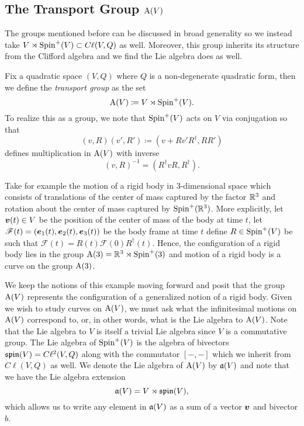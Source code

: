 \documentclass{article}
\begin{document}
\subsection{The Transport Group $\operatorname{A}(V)$}

The groups mentioned before can be discussed in broad generality so we instead take $V\rtimes \operatorname{Spin}^+(V) \subset C\ell(V,Q)$ as well. Moreover, this group inherits its structure from the Clifford algebra and we find the Lie algebra does as well. 

\begin{definition}
Fix a quadratic space $(V,Q)$ where $Q$ is a non-degenerate quadratic form, then we define the \emph{transport group} as the set
\begin{equation}
\operatorname{A}(V)\coloneqq V\rtimes \operatorname{Spin}^+(V).
\end{equation}
To realize this as a group, we note that $\operatorname{Spin}^+(V)$ acts on $V$ via conjugation so that
\begin{equation}
\label{eq:product_in_A}
(v,R)(v',R')\coloneqq(v+Rv'R^\dagger, RR')
\end{equation}
defines multiplication in $\operatorname{A}(V)$ with inverse
\begin{equation}
(v,R)^{-1} = (R^\dagger v R, R^\dagger).
\end{equation}
\end{definition}

\begin{example}
Take for example the motion of a rigid body in 3-dimensional space which consists of translations of the center of mass captured by the factor $\mathbb{R}^3$ and rotation about the center of mass captured by $\operatorname{Spin}^+(\mathbb{R}^3)$. More explicitly, let $\boldsymbol{v}(t) \in V$ be the position of the center of mass of the body at time $t$, let $\mathscr{F}(t)=(\boldsymbol{e}_1(t),\boldsymbol{e}_2(t),\boldsymbol{e}_3(t))$ be the body frame at time $t$ define $R \in \operatorname{Spin}^+(V)$ be such that $\mathscr{F}(t)=R(t)\mathscr{F}(0)R^\dagger(t)$. Hence, the configuration of a rigid body lies in the group $\operatorname{A}(3)=\mathbb{R}^3 \rtimes \operatorname{Spin}^+(3)$ and motion of a rigid body is a curve on the group $\operatorname{A}(3)$.
\end{example}

We keep the notions of this example moving forward and posit that the group $\operatorname{A}(V)$ represents the configuration of a generalized notion of a rigid body. Given we wish to study curves on $\operatorname{A}(V)$, we must ask what the infinitesimal motions on $\operatorname{A}(V)$ correspond to, or, in other words, what is the Lie algebra to $\operatorname{A}(V)$. Note that the Lie algebra to $V$ is itself a trivial Lie algebra since $V$ is a commutative group. The Lie algebra of $\operatorname{Spin}^+(V)$ is the algebra of bivectors $\mathfrak{spin}(V)=C\ell^2(V,Q)$ along with the commutator $[-,-]$ which we inherit from $C\ell(V,Q)$ as well. We denote the Lie algebra of $\operatorname{A}(V)$ by $\mathfrak{a}(V)$ and note that we have the Lie algebra extension
\begin{equation}
\label{eq:extension}
\mathfrak{a}(V)=V\rtimes\mathfrak{spin}(V),
\end{equation}
which allows us to write any element in $\mathfrak{a}(V)$ as a sum of a vector $\boldsymbol{v}$ and bivector $b$. 
\end{document}
